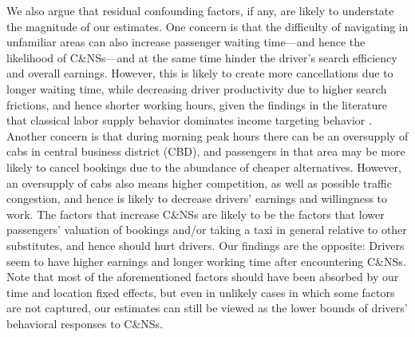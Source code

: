 \documentclass[reviewmode]{restud}
\begin{document}
We also argue that residual confounding factors, if any, are likely to understate the magnitude of our estimates. One concern is that the difficulty of navigating in unfamiliar areas can also increase passenger waiting time---and hence the likelihood of C\&NSs---and at the same time hinder the driver's search efficiency and overall earnings. However, this is likely to create more cancellations due to longer waiting time, while decreasing driver productivity due to higher search frictions, and hence shorter working hours, given the findings in the literature that classical labor supply behavior dominates income targeting behavior \citep{farber2015you}. Another concern is that during morning peak hours there can be an oversupply of cabs in central business district (CBD), and passengers in that area may be more likely to cancel bookings due to the abundance of cheaper alternatives. However, an oversupply of cabs also means higher competition, as well as possible traffic congestion, and hence is likely to decrease drivers' earnings and willingness to work.  The factors that increase C\&NSs are likely to be the factors that lower passengers' valuation of bookings and/or taking a taxi in general relative to other substitutes, and hence should hurt drivers. Our findings are the opposite: Drivers seem to have higher earnings and longer working time after encountering C\&NSs. Note that most of the aforementioned factors should have been absorbed by our time and location fixed effects, but even in unlikely cases in which some factors are not captured, our estimates can still be viewed as the lower bounds of drivers' behavioral responses to C\&NSs.
\end{document}
